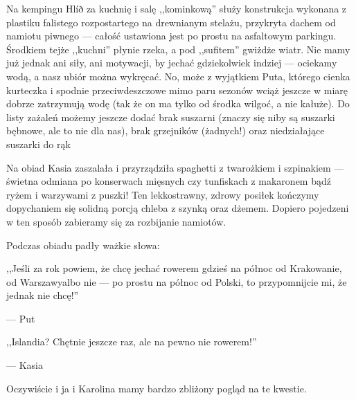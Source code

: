 Na kempingu Hlíð za kuchnię i salę ,,kominkową'' służy konstrukcja wykonana z plastiku falistego rozpostartego na drewnianym stelażu, przykryta dachem od namiotu piwnego --- całość ustawiona jest po prostu na asfaltowym parkingu. Środkiem tejże ,,kuchni'' płynie rzeka, a pod ,,sufitem'' gwiżdże wiatr. Nie mamy już jednak ani siły, ani motywacji, by jechać gdziekolwiek indziej --- ociekamy wodą, a nasz ubiór można wykręcać. No, może z wyjątkiem Puta, którego cienka kurteczka i spodnie przeciwdeszczowe mimo paru sezonów wciąż jeszcze w miarę dobrze zatrzymują wodę (tak że on ma tylko od środka wilgoć, a nie kałuże). Do listy zażaleń możemy jeszcze dodać brak suszarni (znaczy się niby są suszarki bębnowe, ale to nie dla nas), brak grzejników (żadnych!) oraz niedziałające suszarki do rąk\textellipsis

Na obiad Kasia zaszalała i przyrządziła spaghetti z twarożkiem i szpinakiem --- świetna odmiana po konserwach mięsnych czy tunfiskach z makaronem bądź ryżem i warzywami z puszki! Ten lekkostrawny, zdrowy posiłek kończymy dopychaniem się solidną porcją chleba z szynką oraz dżemem. Dopiero pojedzeni w ten sposób zabieramy się za rozbijanie namiotów.


\medskip

Podczas obiadu padły ważkie słowa:

\vspace{-1em}

\epigraph{,,Jeśli za rok powiem, że chcę jechać rowerem gdzieś na północ od Krakowa\textellipsis nie, od Warszawy\textellipsis albo nie --- po prostu na północ od Polski, to przypomnijcie mi, że jednak nie chcę!''}{--- \textup{Put}}

\vspace{-2em}

\epigraph{,,Islandia? Chętnie jeszcze raz, ale na pewno nie rowerem!''}{--- \textup{Kasia}}

\vspace{-1em}

\noindent Oczywiście i ja i Karolina mamy bardzo zbliżony pogląd na te kwestie.

